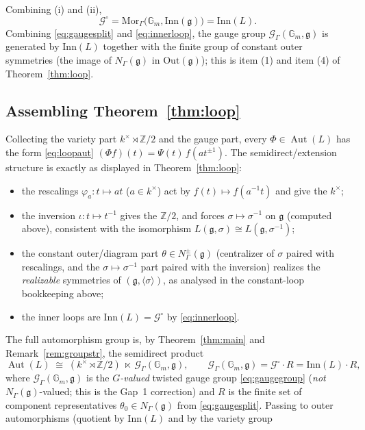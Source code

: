 \documentclass{amsart}
\theoremstyle{definition}
\DeclareMathOperator{\Aut}{Aut}
\newcommand{\Gm}{\mathbb{G}_m}
\newcommand{\g}{\mathfrak{g}}
\newcommand{\Z}{\mathbb{Z}}
\begin{document}
Combining (i) and (ii),
\begin{equation}\label{eq:innerloop}
\mathcal G^\circ=\mathrm{Mor}_\Gamma\bigl(\Gm,\mathrm{Inn}(\g)\bigr)
=\mathrm{Inn}(L).
\end{equation}
Combining \eqref{eq:gaugesplit} and \eqref{eq:innerloop}, the gauge group
$\mathcal G_\Gamma(\Gm,\g)$ is generated by $\mathrm{Inn}(L)$ together with
the finite group of constant outer symmetries (the image of $N_\Gamma(\g)$
in $\mathrm{Out}(\g)$); this is item (1) and item (4) of
Theorem~\ref{thm:loop}.

\subsection{Assembling Theorem~\ref{thm:loop}}
Collecting the variety part $k^\times\rtimes\Z/2$ and the gauge part, every
$\Phi\in\Aut(L)$ has the form \eqref{eq:loopaut}
$(\Phi f)(t)=\Psi(t)\,f(at^{\pm1})$.  The semidirect/extension structure is
exactly as displayed in Theorem~\ref{thm:loop}:
\begin{itemize}
\item the rescalings $\varphi_a:t\mapsto at$ ($a\in k^\times$) act by
$f(t)\mapsto f(a^{-1}t)$ and give the $k^\times$;
\item the inversion $\iota:t\mapsto t^{-1}$ gives the $\Z/2$, and forces
$\sigma\mapsto\sigma^{-1}$ on $\g$ (computed above), consistent with the
isomorphism $L(\g,\sigma)\cong L(\g,\sigma^{-1})$;
\item the constant outer/diagram part $\theta\in N^\pm_\Gamma(\g)$
(centralizer of $\sigma$ paired with rescalings, and the
$\sigma\mapsto\sigma^{-1}$ part paired with the inversion) realizes the
\emph{realizable} symmetries of $(\g,\langle\sigma\rangle)$, as analysed in
the constant-loop bookkeeping above;
\item the inner loops are $\mathrm{Inn}(L)=\mathcal G^\circ$ by
\eqref{eq:innerloop}.
\end{itemize}
The full automorphism group is, by Theorem~\ref{thm:main} and
Remark~\ref{rem:groupstr}, the semidirect product
\[
\Aut(L)\;\cong\;(k^\times\rtimes\Z/2)\ \ltimes\ \mathcal G_\Gamma(\Gm,\g),
\qquad
\mathcal G_\Gamma(\Gm,\g)=\mathcal G^\circ\cdot R
=\mathrm{Inn}(L)\cdot R,
\]
where $\mathcal G_\Gamma(\Gm,\g)$ is the \emph{$G$-valued} twisted gauge
group \eqref{eq:gaugegroup} (\emph{not} $N_\Gamma(\g)$-valued; this is the
Gap~1 correction) and $R$ is the finite set of component representatives
$\theta_0\in N_\Gamma(\g)$ from \eqref{eq:gaugesplit}.  Passing to outer
automorphisms (quotient by $\mathrm{Inn}(L)$ and by the variety group
\end{document}
